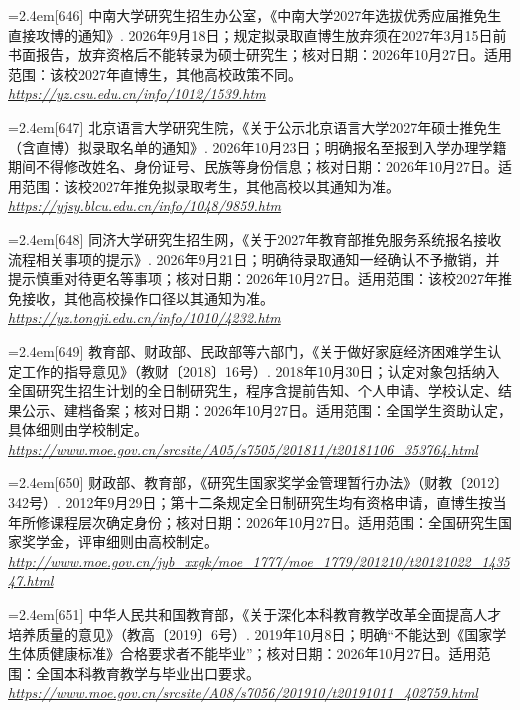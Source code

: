 \par\noindent\hangindent=2.4em\label{src:S0792}{\color{cAccent}[646]} 中南大学研究生招生办公室，《中南大学2027年选拔优秀应届推免生直接攻博的通知》. 2026年9月18日；规定拟录取直博生放弃须在2027年3月15日前书面报告，放弃资格后不能转录为硕士研究生；核对日期：2026年10月27日。适用范围：该校2027年直博生，其他高校政策不同。 \textit{\url{https://yz.csu.edu.cn/info/1012/1539.htm}}\par
\par\noindent\hangindent=2.4em\label{src:S0793}{\color{cAccent}[647]} 北京语言大学研究生院，《关于公示北京语言大学2027年硕士推免生（含直博）拟录取名单的通知》. 2026年10月23日；明确报名至报到入学办理学籍期间不得修改姓名、身份证号、民族等身份信息；核对日期：2026年10月27日。适用范围：该校2027年推免拟录取考生，其他高校以其通知为准。 \textit{\url{https://yjsy.blcu.edu.cn/info/1048/9859.htm}}\par
\par\noindent\hangindent=2.4em\label{src:S0794}{\color{cAccent}[648]} 同济大学研究生招生网，《关于2027年教育部推免服务系统报名接收流程相关事项的提示》. 2026年9月21日；明确待录取通知一经确认不予撤销，并提示慎重对待更名等事项；核对日期：2026年10月27日。适用范围：该校2027年推免接收，其他高校操作口径以其通知为准。 \textit{\url{https://yz.tongji.edu.cn/info/1010/4232.htm}}\par
\par\noindent\hangindent=2.4em\label{src:S0795}{\color{cAccent}[649]} 教育部、财政部、民政部等六部门，《关于做好家庭经济困难学生认定工作的指导意见》（教财〔2018〕16号）. 2018年10月30日；认定对象包括纳入全国研究生招生计划的全日制研究生，程序含提前告知、个人申请、学校认定、结果公示、建档备案；核对日期：2026年10月27日。适用范围：全国学生资助认定，具体细则由学校制定。 \textit{\url{https://www.moe.gov.cn/srcsite/A05/s7505/201811/t20181106_353764.html}}\par
\par\noindent\hangindent=2.4em\label{src:S0796}{\color{cAccent}[650]} 财政部、教育部，《研究生国家奖学金管理暂行办法》（财教〔2012〕342号）. 2012年9月29日；第十二条规定全日制研究生均有资格申请，直博生按当年所修课程层次确定身份；核对日期：2026年10月27日。适用范围：全国研究生国家奖学金，评审细则由高校制定。 \textit{\url{http://www.moe.gov.cn/jyb_xxgk/moe_1777/moe_1779/201210/t20121022_143547.html}}\par
\par\noindent\hangindent=2.4em\label{src:S0797}{\color{cAccent}[651]} 中华人民共和国教育部，《关于深化本科教育教学改革全面提高人才培养质量的意见》（教高〔2019〕6号）. 2019年10月8日；明确“不能达到《国家学生体质健康标准》合格要求者不能毕业”；核对日期：2026年10月27日。适用范围：全国本科教育教学与毕业出口要求。 \textit{\url{https://www.moe.gov.cn/srcsite/A08/s7056/201910/t20191011_402759.html}}\par
